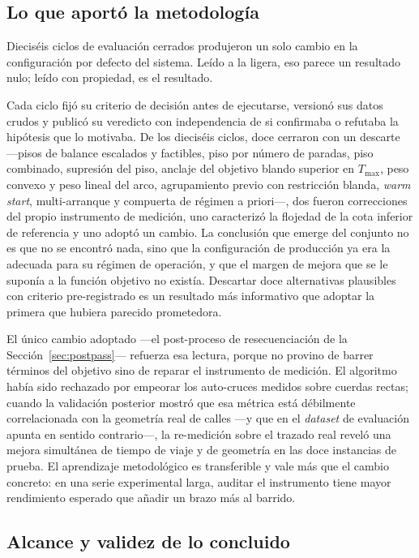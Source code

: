 \subsection{Lo que aportó la metodología}

Dieciséis ciclos de evaluación cerrados produjeron un solo cambio en la configuración
por defecto del sistema. Leído a la ligera, eso parece un resultado nulo; leído con
propiedad, es el resultado.

Cada ciclo fijó su criterio de decisión antes de ejecutarse, versionó sus datos crudos
y publicó su veredicto con independencia de si confirmaba o refutaba la hipótesis que
lo motivaba. De los dieciséis ciclos, doce cerraron con un descarte ---pisos de
balance escalados y factibles, piso por número de paradas, piso combinado, supresión
del piso, anclaje del objetivo blando superior en $T_{\max}$, peso convexo y peso
lineal del arco, agrupamiento previo con restricción blanda, \textit{warm start},
multi-arranque y compuerta de régimen a priori---, dos fueron correcciones del propio
instrumento de medición, uno caracterizó la flojedad de la cota inferior de referencia
y uno adoptó un cambio. La conclusión que emerge del conjunto no es que no se encontró
nada, sino que la configuración de producción ya era la adecuada para su régimen de
operación, y que el margen de mejora que se le suponía a la función objetivo no
existía. Descartar doce alternativas plausibles con criterio pre-registrado es un
resultado más informativo que adoptar la primera que hubiera parecido prometedora.

El único cambio adoptado ---el post-proceso de resecuenciación de la
Sección~\ref{sec:postpass}--- refuerza esa lectura, porque no provino de barrer
términos del objetivo sino de reparar el instrumento de medición. El algoritmo había
sido rechazado por empeorar los auto-cruces medidos sobre cuerdas rectas; cuando la
validación posterior mostró que esa métrica está débilmente correlacionada con la
geometría real de calles ---y que en el \textit{dataset} de evaluación apunta en
sentido contrario---, la re-medición sobre el trazado real reveló una mejora
simultánea de tiempo de viaje y de geometría en las doce instancias de prueba. El
aprendizaje metodológico es transferible y vale más que el cambio concreto: en una
serie experimental larga, auditar el instrumento tiene mayor rendimiento esperado que
añadir un brazo más al barrido.

\subsection{Alcance y validez de lo concluido}

